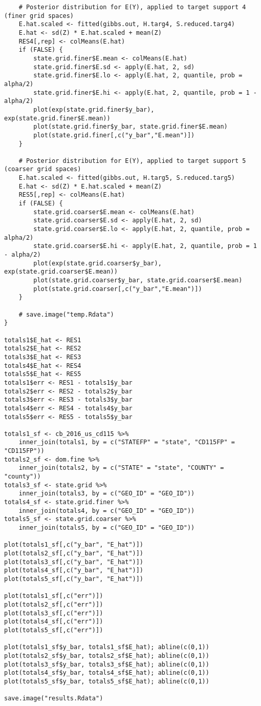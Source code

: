 \documentclass[12pt]{article}
\begin{document}
\begin{footnotesize}
\begin{verbatim}
    # Posterior distribution for E(Y), applied to target support 4 (finer grid spaces)
    E.hat.scaled <- fitted(gibbs.out, H.targ4, S.reduced.targ4)
    E.hat <- sd(Z) * E.hat.scaled + mean(Z)
    RES4[,rep] <- colMeans(E.hat)
    if (FALSE) {
        state.grid.finer$E.mean <- colMeans(E.hat)
        state.grid.finer$E.sd <- apply(E.hat, 2, sd)
        state.grid.finer$E.lo <- apply(E.hat, 2, quantile, prob = alpha/2)
        state.grid.finer$E.hi <- apply(E.hat, 2, quantile, prob = 1 - alpha/2)
        plot(exp(state.grid.finer$y_bar), exp(state.grid.finer$E.mean))
        plot(state.grid.finer$y_bar, state.grid.finer$E.mean)
        plot(state.grid.finer[,c("y_bar","E.mean")])
    }

    # Posterior distribution for E(Y), applied to target support 5 (coarser grid spaces)
    E.hat.scaled <- fitted(gibbs.out, H.targ5, S.reduced.targ5)
    E.hat <- sd(Z) * E.hat.scaled + mean(Z)
    RES5[,rep] <- colMeans(E.hat)
    if (FALSE) {
        state.grid.coarser$E.mean <- colMeans(E.hat)
        state.grid.coarser$E.sd <- apply(E.hat, 2, sd)
        state.grid.coarser$E.lo <- apply(E.hat, 2, quantile, prob = alpha/2)
        state.grid.coarser$E.hi <- apply(E.hat, 2, quantile, prob = 1 - alpha/2)
        plot(exp(state.grid.coarser$y_bar), exp(state.grid.coarser$E.mean))
        plot(state.grid.coarser$y_bar, state.grid.coarser$E.mean)
        plot(state.grid.coarser[,c("y_bar","E.mean")])
    }

    # save.image("temp.Rdata")
}

totals1$E_hat <- RES1
totals2$E_hat <- RES2
totals3$E_hat <- RES3
totals4$E_hat <- RES4
totals5$E_hat <- RES5
totals1$err <- RES1 - totals1$y_bar
totals2$err <- RES2 - totals2$y_bar
totals3$err <- RES3 - totals3$y_bar
totals4$err <- RES4 - totals4$y_bar
totals5$err <- RES5 - totals5$y_bar

totals1_sf <- cb_2016_us_cd115 %>%
    inner_join(totals1, by = c("STATEFP" = "state", "CD115FP" = "CD115FP"))
totals2_sf <- dom.fine %>%
    inner_join(totals2, by = c("STATE" = "state", "COUNTY" = "county"))
totals3_sf <- state.grid %>%
    inner_join(totals3, by = c("GEO_ID" = "GEO_ID"))
totals4_sf <- state.grid.finer %>%
    inner_join(totals4, by = c("GEO_ID" = "GEO_ID"))
totals5_sf <- state.grid.coarser %>%
    inner_join(totals5, by = c("GEO_ID" = "GEO_ID"))

plot(totals1_sf[,c("y_bar", "E_hat")])
plot(totals2_sf[,c("y_bar", "E_hat")])
plot(totals3_sf[,c("y_bar", "E_hat")])
plot(totals4_sf[,c("y_bar", "E_hat")])
plot(totals5_sf[,c("y_bar", "E_hat")])

plot(totals1_sf[,c("err")])
plot(totals2_sf[,c("err")])
plot(totals3_sf[,c("err")])
plot(totals4_sf[,c("err")])
plot(totals5_sf[,c("err")])

plot(totals1_sf$y_bar, totals1_sf$E_hat); abline(c(0,1))
plot(totals2_sf$y_bar, totals2_sf$E_hat); abline(c(0,1))
plot(totals3_sf$y_bar, totals3_sf$E_hat); abline(c(0,1))
plot(totals4_sf$y_bar, totals4_sf$E_hat); abline(c(0,1))
plot(totals5_sf$y_bar, totals5_sf$E_hat); abline(c(0,1))

save.image("results.Rdata")
\end{verbatim}
\end{footnotesize}




%
\end{document}

